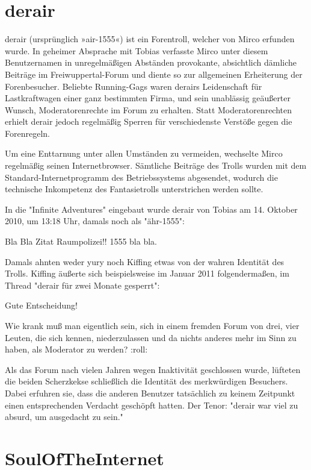 \section{derair}

derair (ursprünglich »air-1555«) ist ein Forentroll, welcher von Mirco erfunden wurde. In geheimer Absprache mit Tobias verfasste Mirco unter diesem Benutzernamen in unregelmäßigen Abständen provokante, absichtlich dämliche Beiträge im Freiwuppertal-Forum und diente so zur allgemeinen Erheiterung der Forenbesucher. Beliebte Running-Gags waren derairs Leidenschaft für Lastkraftwagen einer ganz bestimmten Firma, und sein unablässig geäußerter Wunsch, Moderatorenrechte im Forum zu erhalten. Statt Moderatorenrechten erhielt derair jedoch regelmäßig Sperren für verschiedenste Verstöße gegen die Forenregeln.

Um eine Enttarnung unter allen Umständen zu vermeiden, wechselte Mirco regelmäßig seinen Internetbrowser. Sämtliche Beiträge des Trolls wurden mit dem Standard-Internetprogramm des Betriebssystems abgesendet, wodurch die technische Inkompetenz des Fantasietrolls unterstrichen werden sollte.

In die "Infinite Adventures" eingebaut wurde derair von Tobias am 14. Oktober 2010, um 13:18 Uhr, damals noch als "ähr-1555":

\begin{itshape}
Bla Bla Zitat Raumpolizei!! 1555 bla bla.
\end{itshape}

Damals ahnten weder yury noch Kiffing etwas von der wahren Identität des Trolls. Kiffing äußerte sich beispielsweise im Januar 2011 folgendermaßen, im Thread "derair für zwei Monate gesperrt":

\begin{itshape}
Gute Entscheidung!

Wie krank muß man eigentlich sein, sich in einem fremden Forum von drei, vier Leuten, die sich kennen, niederzulassen und da nichts anderes mehr im Sinn zu haben, als Moderator zu werden? :roll:
\end{itshape}

Als das Forum nach vielen Jahren wegen Inaktivität geschlossen wurde, lüfteten die beiden Scherzkekse schließlich die Identität des merkwürdigen Besuchers. Dabei erfuhren sie, dass die anderen Benutzer tatsächlich zu keinem Zeitpunkt einen entsprechenden Verdacht geschöpft hatten. Der Tenor: "derair war viel zu absurd, um ausgedacht zu sein."

\section{SoulOfTheInternet}

